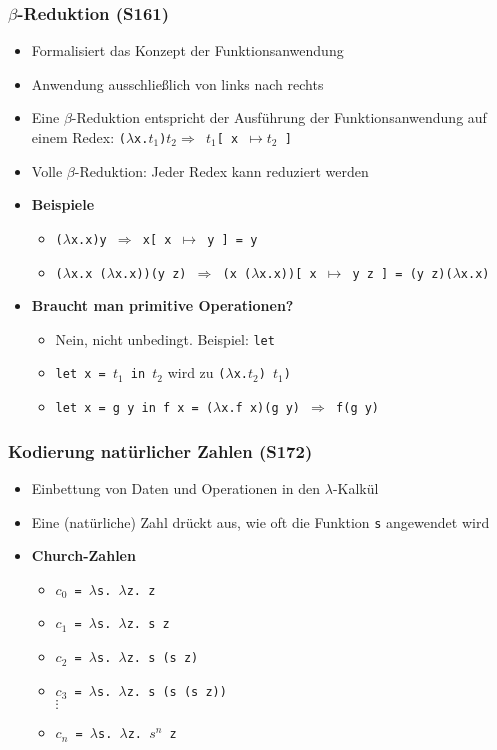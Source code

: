 \subsubsection{$\beta$-Reduktion (S161)}
\begin{itemize}
	\item Formalisiert das Konzept der Funktionsanwendung
	\item Anwendung ausschließlich von links nach rechts
	\item Eine \(\beta\)-Reduktion entspricht der Ausführung der Funktionsanwendung auf einem Redex: \texttt{(\(\lambda\)x.\(t_1\))\(t_2 \Rightarrow\) \(t_1\){[} x \(\mapsto t_2\) {]}}
	\item Volle \(\beta\)-Reduktion: Jeder Redex kann reduziert werden
	\item \textbf{Beispiele}
	\begin{itemize}
		\item \texttt{(\(\lambda\)x.x)y \(\Rightarrow\) x{[} x \(\mapsto\) y {]} = y}
		\item \texttt{(\(\lambda\)x.x (\(\lambda\)x.x))(y z) \(\Rightarrow\) (x (\(\lambda\)x.x)){[} x \(\mapsto\) y z {]} = (y z)(\(\lambda\)x.x)}
	\end{itemize}
	\item \textbf{Braucht man primitive Operationen?}
	\begin{itemize}
		\item Nein, nicht unbedingt. Beispiel: \texttt{let}
		\item \texttt{let x = \(t_1\) in \(t_2\)} wird zu \texttt{(\(\lambda\)x.\(t_2\)) \(t_1\))}
		\item \texttt{let x = g y in f x = (\(\lambda\)x.f x)(g y) \(\Rightarrow\) f(g y)}
	\end{itemize}
\end{itemize}

\subsubsection{Kodierung natürlicher Zahlen (S172)}
\begin{itemize}
	\item Einbettung von Daten und Operationen in den \(\lambda\)-Kalkül
	\item Eine (natürliche) Zahl drückt aus, wie oft die Funktion \texttt{s} angewendet wird
	\item \textbf{Church-Zahlen}
	\begin{itemize}
		\item \texttt{\(c_0\) = \(\lambda\)s. \(\lambda\)z. z}
		\item \texttt{\(c_1\) = \(\lambda\)s. \(\lambda\)z. s z}
		\item \texttt{\(c_2\) = \(\lambda\)s. \(\lambda\)z. s (s z)}
		\item \texttt{\(c_3\) = \(\lambda\)s. \(\lambda\)z. s (s (s z))} \\ \(\vdots\)
		\item \texttt{\(c_n\) = \(\lambda\)s. \(\lambda\)z. \(s^n\) z}
	\end{itemize}
\end{itemize}

